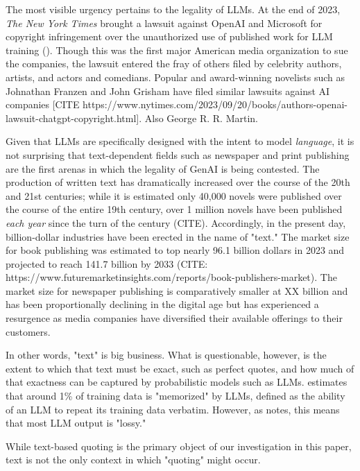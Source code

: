 \documentclass{article}
\begin{document}
The most visible urgency pertains to the legality of LLMs. 
At the end of 2023, \emph{The New York Times} brought a lawsuit against OpenAI and Microsoft for copyright infringement over the unauthorized use of published work for LLM training (\cite{grynbaum_times_2023}). Though this was the first major American media organization to sue the companies, the lawsuit entered the fray of others filed by celebrity authors, artists, and actors and comedians.  Popular and award-winning novelists such as Johnathan Franzen and John Grisham have filed similar lawsuits against AI companies [CITE https://www.nytimes.com/2023/09/20/books/authors-openai-lawsuit-chatgpt-copyright.html]. Also George R. R. Martin.

Given that LLMs are specifically designed with the intent to model \emph{language}, it is not surprising that text-dependent fields such as newspaper and print publishing are the first arenas in which the legality of GenAI is being contested. The production of written text has dramatically increased over the course of the 20th and 21st centuries; while it is estimated only 40,000 novels were published over the course of the entire 19th century, over 1 million novels have been published \emph{each year} since the turn of the century (CITE). Accordingly, in the present day, billion-dollar industries have been erected in the name of "text." The market size for book publishing was estimated to top nearly 96.1 billion dollars in 2023 and projected to reach 141.7 billion by 2033 (CITE: https://www.futuremarketinsights.com/reports/book-publishers-market). The market size for newspaper publishing is comparatively smaller at XX billion and has been proportionally declining in the digital age but has experienced a resurgence as media companies have diversified their available offerings to their customers. 

In other words, "text" is big business. What is questionable, however, is the extent to which that text must be exact, such as perfect quotes, and how much of that exactness can be captured by probabilistic models such as LLMs. \cite{carlini2023quantifying} estimates that around 1\% of training data is "memorized" by LLMs, defined as the ability of an LLM to repeat its training data verbatim. However, as \cite{chiang2023chatgpt} notes, this means that most LLM output is "lossy." 

While text-based quoting is the primary object of our investigation in this paper, text is not the only context in which "quoting" might occur. 
\end{document}
